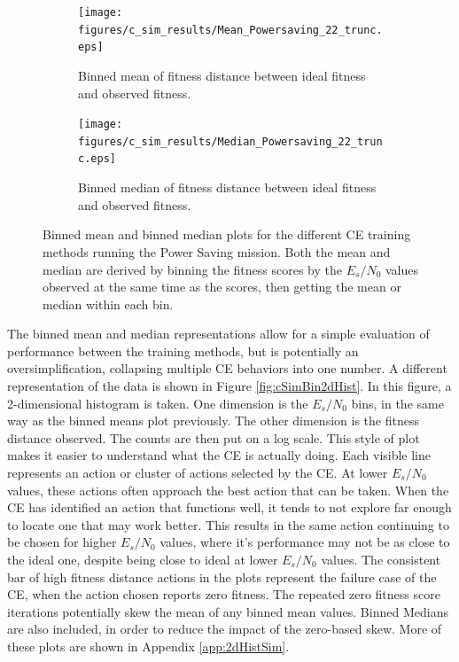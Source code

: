 \begin{figure}[ht]
\centering
\begin{subfigure}{0.48\linewidth}
\centering
\texttt{[image: figures/c\_sim\_results/Mean\_Powersaving\_22\_trunc.eps]}
\caption{Binned mean of fitness distance between ideal fitness and observed fitness.}
\end{subfigure}\hfill%
\begin{subfigure}{0.48\linewidth}
\centering
\texttt{[image: figures/c\_sim\_results/Median\_Powersaving\_22\_trunc.eps]}
\caption{Binned median of fitness distance between ideal fitness and observed fitness.}
\end{subfigure}
\caption{Binned mean and binned median plots for the different CE training methods running the Power Saving mission. Both the mean and median are derived by binning the fitness scores by the $E_s/N_0$ values observed at the same time as the scores, then getting the mean or median within each bin.} \label{fig:cSimBinMeanMedPwr}
\end{figure}

\par The binned mean and median representations allow for a simple evaluation of performance between the training methods, but is potentially an oversimplification, collapsing multiple CE behaviors into one number. A different representation of the data is shown in Figure \ref{fig:cSimBin2dHist}. In this figure, a 2-dimensional histogram is taken. One dimension is the $E_s/N_0$ bins, in the same way as the binned means plot previously. The other dimension is the fitness distance observed. The counts are then put on a log scale. This style of plot makes it easier to understand what the CE is actually doing. Each visible line represents an action or cluster of actions selected by the CE. At lower $E_s/N_0$ values, these actions often approach the best action that can be taken. When the CE has identified an action that functions well, it tends to not explore far enough to locate one that may work better. This results in the same action continuing to be chosen for higher $E_s/N_0$ values, where it's performance may not be as close to the ideal one, despite being close to ideal at lower $E_s/N_0$ values. The consistent bar of high fitness distance actions in the plots represent the failure case of the CE, when the action chosen reports zero fitness. The repeated zero fitness score iterations potentially skew the mean of any binned mean values. Binned Medians are also included, in order to reduce the impact of the zero-based skew. More of these plots are shown in Appendix \ref{app:2dHistSim}.

